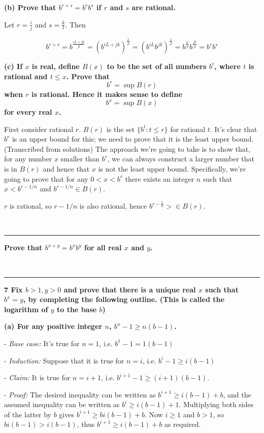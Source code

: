 \textbf{
(b) Prove that $b^{r+s} = b^rb^s$ if $r$ and $s$ are rational.
}

Let $r=\frac{i}{j}$ and $s=\frac{k}{l}$. Then

$$
b^{r+s} =
b^\frac{iL + jk}{jl} =
(b^{iL + jk})^\frac{1}{jl} =
(b^{iL}b^{jk})^\frac{1}{jl} =
b^\frac{il}{jl}b^\frac{jk}{jl} =
b^{r}b^{s}
$$

\textbf{(c) If $x$ is real, define $B(x)$ to be the set of all numbers $b^t$, where
$t$ is rational and $t \leq x$. Prove that $$b^r = \sup B(r)$$ when $r$ is
rational. Hence it makes sense to define $$b^x = \sup B(x)$$ for every real $x$.
}

First consider rational $r$. $B(r)$ is the set $\{b^t: t \leq r\}$ for rational
$t$. It's clear that $b^r$ is an upper bound for this; we need to prove that it
is the least upper bound. (Transcribed from solutions) The approach we're going
to take is to show that, for any number $x$ smaller than $b^r$, we can always
construct a larger number that is in $B(r)$ and hence that $x$ is not the least
upper bound. Specifically, we're going to prove that for any $0 < x < b^r$
there exists an integer $n$ such that $x < b^{r - 1/n}$ and $b^{r - 1/n} \in
B(r)$.

$r$ is rational, so $r - 1/n$ is also rational, hence $b^{r - \frac{1}{n}}> \in B(r)$.

~\\\hrule
\textbf{Prove that $b^{x+y} = b^xb^y$ for all real $x$ and $y$. }

~\\\hrule
\textbf{7 Fix $b > 1, y > 0$ and prove that there is a unique real $x$ such that
$b^x = y$, by completing the following outline. (This is called the logarithm
of $y$ to the base $b$)}

\textbf{(a) For any positive integer $n$, $b^n - 1 \geq n(b-1)$.}

- \textit{Base case:} It's true for $n=1$, i.e. $b^1 - 1 = 1(b-1)$

- \textit{Induction:} Suppose that it is true for $n=i$, i.e. $b^i - 1 \geq i(b-1)$

    - \textit{Claim:} It is true for $n=i+1$, i.e. $b^{i+1} - 1 \geq (i+1)(b-1)$.

    - \textit{Proof:} The desired inequality can be written as $b^{i+1} \geq i(b-1) +
      b$, and the assumed inequality can be written as $b^i \geq i(b-1) +
      1$. Multiplying both sides of the latter by $b$ gives $b^{i+1} \geq
      bi(b-1) + b$. Now $i \geq 1$ and $b>1$, so $bi(b-1) > i(b-1)$, thus
      $b^{i+1} \geq i(b-1) + b$ as required.


